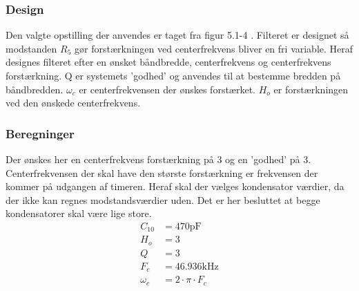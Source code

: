 \subsubsection{Design}
Den valgte opstilling der anvendes er taget fra figur 5.1-4 \cite[side. 208]{Huelsman1993}.
Filteret er designet så modstanden $R_5$ gør forstærkningen ved centerfrekvens bliver en fri variable.
Heraf designes filteret efter en ønsket båndbredde, centerfrekvens og centerfrekvens forstærkning. Q er systemets 'godhed' og anvendes til at bestemme bredden på båndbredden. 
$\omega_c$ er centerfrekvensen der ønskes forstærket.
$H_o$ er forstærkningen ved den ønskede centerfrekvens.

\subsubsection{Beregninger}
Der ønskes her en centerfrekvens forstærkning på 3 og en 'godhed' på 3. 
Centerfrekvensen der skal have den største forstærkning er frekvensen der kommer på udgangen af timeren. 
Heraf skal der vælges kondensator værdier, da der ikke kan regnes modstandsværdier uden. 
Det er her besluttet at begge kondensatorer skal være lige store.
\begin{align}
C_{10} & = 470 \si{\pico\farad} \nonumber \\
H_o & = 3 \nonumber \\
Q & = 3 \nonumber \\
F_c & = 46.936 \si{\kilo\hertz} \nonumber \\
\omega_c & = 2 \cdot \pi \cdot F_c
\end{align}


